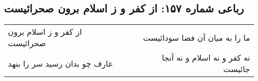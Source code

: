 \begin{center}
\section*{رباعی شماره ۱۵۷: از کفر و ز اسلام برون صحرائیست}
\label{sec:0157}
\begin{longtable}{l p{0.5cm} r}
از کفر و ز اسلام برون صحرائیست
&&
ما را به میان آن فضا سودائیست
\\
عارف چو بدان رسید سر را بنهد
&&
نه کفر و نه اسلام و نه آنجا جائیست
\\
\end{longtable}
\end{center}

